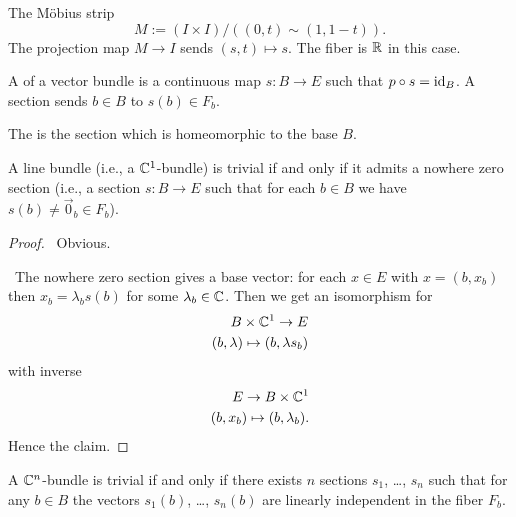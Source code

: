 \begin{example}
The M\"{o}bius strip 
\begin{equation}
M:=(I\times I)/((0,t)\sim(1,1-t)).
\end{equation}
The projection map $M\to I$ sends $(s,t)\mapsto s$. The fiber is $\mathbb{R}$
in this case.
\end{example}

\begin{definition}
A  of a vector bundle is a continuous map $s\colon B\to E$
such that $p\circ s=\operatorname{id}_{B}$. A section sends $b\in B$ to $s(b)\in F_{b}$.
\end{definition}

\begin{remark}
The  is the section which is homeomorphic to the
base $B$.
\end{remark}

\begin{lemma}
A line bundle (i.e., a $\mathbb{C}^{1}$-bundle) is trivial if and only if it
admits a nowhere zero section (i.e., a section $s\colon B\to E$ such
that for each $b\in B$ we have $s(b)\neq \vec{0}_{b}\in F_{b}$).
\end{lemma}

\begin{proof}
\forwardproof\ Obvious.

\backwardproof\ The nowhere zero section gives a base vector: for each
$x\in E$ with $x=(b,x_{b})$ then $x_{b}=\lambda_{b} s(b)$ for some $\lambda_{b}\in\mathbb{C}$.
Then we get an isomorphism for
\begin{equation}
\begin{split}
B\times\mathbb{C}^{1}\to E\\
(b,\lambda)\mapsto(b,\lambda s_{b})
\end{split}
\end{equation}
with inverse
\begin{equation}
\begin{split}
E\to B\times\mathbb{C}^{1}\\
(b,x_{b})\mapsto(b,\lambda_{b}).
\end{split}
\end{equation}
Hence the claim.
\end{proof}

\begin{lemma}
A $\mathbb{C}^{n}$-bundle is trivial if and only if there exists $n$ sections
$s_{1}$, \dots, $s_{n}$ such that for any $b\in B$ the vectors
$s_{1}(b)$, \dots, $s_{n}(b)$ are linearly independent in the fiber $F_{b}$.
\end{lemma}

